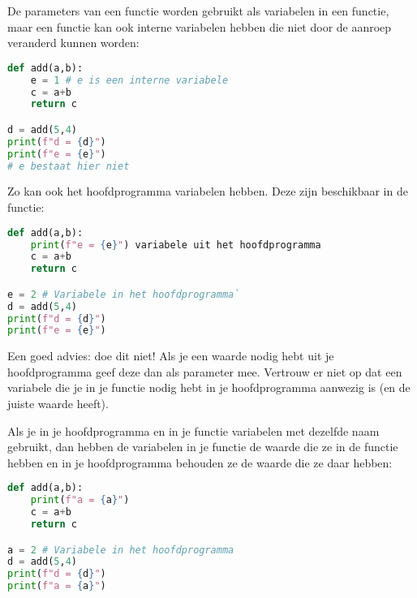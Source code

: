 De parameters van een functie worden gebruikt als variabelen in een functie, maar een functie kan ook interne variabelen hebben die niet door de aanroep veranderd kunnen worden:
\begin{lstlisting}[language=python]
def add(a,b):
    e = 1 # e is een interne variabele
    c = a+b
    return c

d = add(5,4)
print(f"d = {d}")
print(f"e = {e}")
# e bestaat hier niet
\end{lstlisting}

Zo kan ook het hoofdprogramma variabelen hebben. Deze zijn beschikbaar in de functie:
\begin{lstlisting}[language=python]
def add(a,b):
    print(f"e = {e}") variabele uit het hoofdprogramma
    c = a+b
    return c

e = 2 # Variabele in het hoofdprogramma`
d = add(5,4)
print(f"d = {d}")
print(f"e = {e}")
\end{lstlisting}
Een goed advies: doe dit niet! Als je een waarde nodig hebt uit je hoofdprogramma geef deze dan als parameter mee. Vertrouw er niet op dat een variabele die je in je functie nodig hebt in je hoofdprogramma aanwezig is (en de juiste waarde heeft).

Als je in je hoofdprogramma en in je functie variabelen met dezelfde naam gebruikt, dan hebben de variabelen in je functie de waarde die ze in de functie hebben en in je hoofdprogramma behouden ze de waarde die ze daar hebben:
\begin{lstlisting}[language=python]
def add(a,b):
    print(f"a = {a}")
    c = a+b
    return c

a = 2 # Variabele in het hoofdprogramma
d = add(5,4)
print(f"d = {d}")
print(f"a = {a}")
\end{lstlisting}

